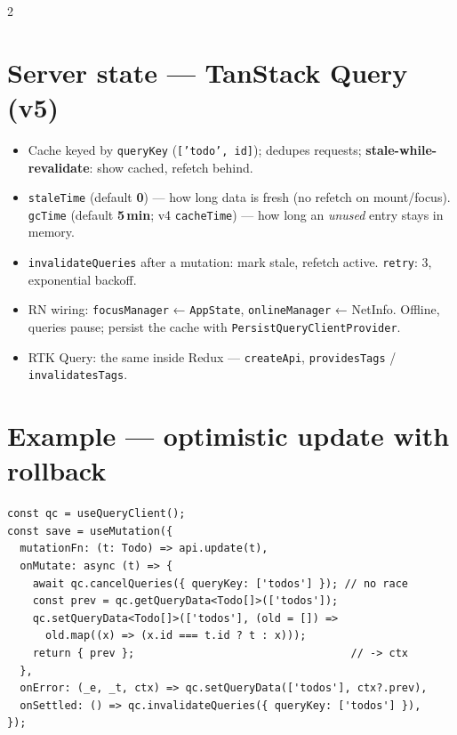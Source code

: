 \documentclass[8pt]{extarticle}
\begin{document}
\begin{multicols}{2}
\raggedright

\section{Server state — TanStack Query (v5)}
\begin{itemize}
  \item Cache keyed by \texttt{queryKey} (\texttt{['todo', id]}); dedupes requests;
        \textbf{stale-while-revalidate}: show cached, refetch behind.
  \item \texttt{staleTime} (default \textbf{0}) — how long data is fresh (no refetch on
        mount/focus). \texttt{gcTime} (default \textbf{5\,min}; v4 \texttt{cacheTime}) —
        how long an \emph{unused} entry stays in memory.
  \item \texttt{invalidateQueries} after a mutation: mark stale, refetch active.
        \texttt{retry}: 3, exponential backoff.
  \item RN wiring: \texttt{focusManager} ← \texttt{AppState}, \texttt{onlineManager} ←
        NetInfo. Offline, queries pause; persist the cache with
        \texttt{PersistQueryClientProvider}.
  \item RTK Query: the same inside Redux — \texttt{createApi}, \texttt{providesTags} /
        \texttt{invalidatesTags}.
\end{itemize}

\section{Example — optimistic update with rollback}
\begin{lstlisting}[language=TSSheet]
const qc = useQueryClient();
const save = useMutation({
  mutationFn: (t: Todo) => api.update(t),
  onMutate: async (t) => {
    await qc.cancelQueries({ queryKey: ['todos'] }); // no race
    const prev = qc.getQueryData<Todo[]>(['todos']);
    qc.setQueryData<Todo[]>(['todos'], (old = []) =>
      old.map((x) => (x.id === t.id ? t : x)));
    return { prev };                                  // -> ctx
  },
  onError: (_e, _t, ctx) => qc.setQueryData(['todos'], ctx?.prev),
  onSettled: () => qc.invalidateQueries({ queryKey: ['todos'] }),
});
\end{lstlisting}


\end{multicols}
\end{document}
